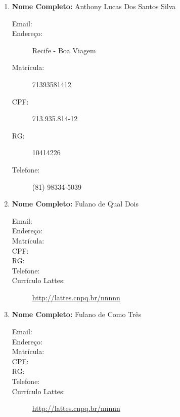 \documentclass[a4paper,12pt]{article} %
\begin{document}
\begin{enumerate}
    \item \textbf{Nome Completo:} Anthony Lucas Dos Santos Silva
    \begin{description}
        \item [Email:] 
        \item [Endereço:] Recife - Boa Viagem
        \item [Matrícula:] 71393581412
        \item [CPF:] 713.935.814-12
        \item [RG:] 10414226
        \item [Telefone:] (81) 98334-5039
    \end{description}

    \item \textbf{Nome Completo:} Fulano de Qual Dois
    \begin{description}
        \item [Email:] 
        \item [Endereço:]
        \item [Matrícula:]
        \item [CPF:]
        \item [RG:]
        \item [Telefone:]
        \item [Currículo Lattes:] \url{http://lattes.cnpq.br/nnnnn}
    \end{description}

    \item \textbf{Nome Completo:} Fulano de Como Três
    \begin{description}
        \item [Email:] 
        \item [Endereço:]
        \item [Matrícula:]
        \item [CPF:]
        \item [RG:]
        \item [Telefone:]
        \item [Currículo Lattes:] \url{http://lattes.cnpq.br/nnnnn}
    \end{description}



\end{enumerate}
\end{document}
